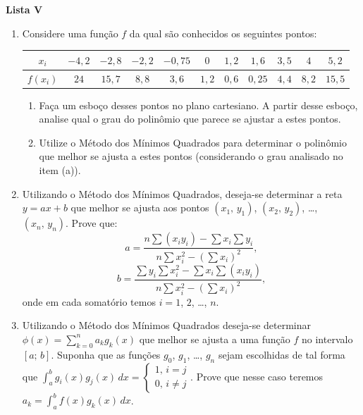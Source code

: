 \documentclass[12pt,a4paper]{article}
\begin{document}
\begin{center}
  \textbf{Lista V}
\end{center}

\begin{enumerate}
  \item Considere uma função $f$ da qual são conhecidos os seguintes pontos:

    \begin{center}
      \begin{tabular}{c|c|c|c|c|c|c|c|c|c|c}
        $x_i$ & $-4,2$ & $-2,8$ & $-2,2$ & $-0,75$ & $0$ & $1,2$ & $1,6$ & $3,5$ & $4$ & $5,2$\\ \hline
        $f(x_i)$ & $24$ & $15,7$ & $8,8$ & $3,6$ & $1,2$ & $0,6$ & $0,25$ & $4,4$ & $8,2$ & $15,5$
       \end{tabular}
    \end{center}

    \begin{enumerate}
      \item Faça um esboço desses pontos no plano cartesiano. A partir desse esboço, 
      analise qual o grau do polinômio que parece se ajustar a estes pontos.
      \item Utilize o Método dos Mínimos Quadrados para determinar o polinômio que
      melhor se ajusta a estes pontos (considerando o grau analisado no item (a)).
    \end{enumerate}

  \item Utilizando o Método dos Mínimos Quadrados, deseja-se determinar a reta
  $y = ax + b$ que melhor se ajusta aos pontos $(x_1,\,y_1)$, $(x_2,\,y_2)$, 
  \ldots, $(x_n,\,y_n)$. Prove que:
  $$a = \dfrac{\displaystyle n\sum (x_iy_i) - \sum x_i\sum y_i}{\displaystyle n\sum x_i^2 - \left(\sum x_i\right)^2},$$
  $$b = \dfrac{\displaystyle \sum y_i\sum x_i^2 - \sum x_i\sum (x_iy_i)}{\displaystyle n\sum x_i^2 - \left(\sum x_i\right)^2},$$
  onde em cada somatório temos $i = 1$, $2$, \ldots, $n$.

  \item Utilizando o Método dos Mínimos Quadrados deseja-se determinar
  $\displaystyle \phi(x) = \sum_{k=0}^n a_kg_k(x)$ que melhor se ajusta a uma função $f$ no intervalo
  $[a;\, b]$. Suponha que as funções $g_0$, $g_1$, \ldots, $g_n$ sejam escolhidas de tal forma que
  $\displaystyle\int_a^b g_i(x)g_j(x)\,dx = \begin{cases}1,\,i = j \\ 0,\,i\neq j\end{cases}$.
  Prove que nesse caso teremos $a_k = \displaystyle\int_a^b f(x)g_k(x)\,dx$.


\end{enumerate}
\end{document}
